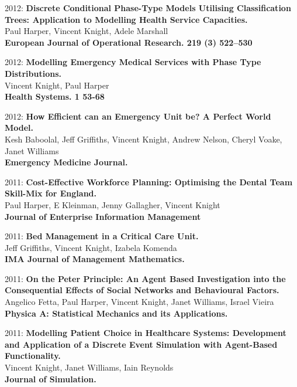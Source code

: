 \documentclass[10pt]{res} %
\begin{document}
\begin{resume}
\begin{etaremune}
\item
2012: \textbf{Discrete Conditional Phase-Type Models Utilising Classification Trees: Application to Modelling Health Service Capacities.}\\
Paul Harper, Vincent Knight, Adele Marshall
\\
\textbf{European Journal of Operational Research. 219 (3) 522--530}
\\

\item
2012: \textbf{Modelling Emergency Medical Services with Phase Type Distributions.}\\
Vincent Knight, Paul Harper
\\
\textbf{Health Systems. 1 53-68}
\\

\item
2012: \textbf{How Efficient can an Emergency Unit be? A Perfect World Model.}\\
Kesh Baboolal, Jeff Griffiths, Vincent Knight, Andrew Nelson, Cheryl Voake, Janet Williams
\\
\textbf{Emergency Medicine Journal.}
\\

\item
2011: \textbf{Cost-Effective Workforce Planning: Optimising the Dental Team Skill-Mix for England.}\\
Paul Harper, E Kleinman, Jenny Gallagher, Vincent Knight
\\
\textbf{Journal of Enterprise Information Management}
\\

\item
2011: \textbf{Bed Management in a Critical Care Unit.}\\
Jeff Griffiths, Vincent Knight, Izabela Komenda
\\
\textbf{IMA Journal of Management Mathematics.}
\\

\item
2011: \textbf{On the Peter Principle: An Agent Based Investigation into the Consequential Effects of Social Networks and Behavioural Factors.}\\
Angelico Fetta, Paul Harper, Vincent Knight, Janet Williams, Israel Vieira
\\
\textbf{Physica A: Statistical Mechanics and its Applications.}
\\

\item
2011: \textbf{Modelling Patient Choice in Healthcare Systems: Development and Application of a Discrete Event Simulation with Agent-Based Functionality.}\\
Vincent Knight, Janet Williams, Iain Reynolds
\\
\textbf{Journal of Simulation.}
\\


\end{etaremune}
\end{resume}
\end{document}
